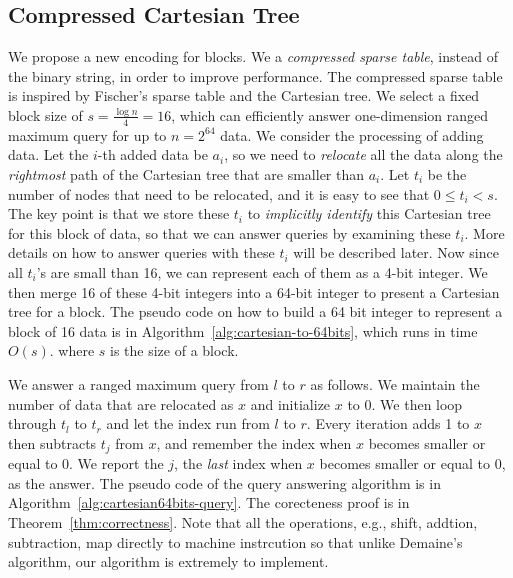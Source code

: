 
\subsection{Compressed Cartesian Tree} \label{sec:cct}

We propose a new encoding for blocks.  We a {\em compressed sparse
  table}, instead of the binary string, in order to improve
performance.  The compressed sparse table is inspired by Fischer's
sparse table and the Cartesian tree.  We select a fixed block size of
$s = {{\frac{\log n}{4}}} = 16$, which can efficiently answer
one-dimension ranged maximum query for up to $n = 2^{64}$ data.  We
consider the processing of adding data.  Let the $i$-th added data be
$a_i$, so we need to {\em relocate} all the data along the {\em
  rightmost} path of the Cartesian tree that are smaller than $a_i$.
Let $t_i$ be the number of nodes that need to be relocated, and it
is easy to see that $0 \le t_i < s$.  The key point is that we store
these $t_i$ to {\em implicitly identify} this Cartesian tree for this
block of data, so that we can answer queries by examining these $t_i$.
More details on how to answer queries with these $t_i$ will be
described later.  Now since all $t_i$'s are small than 16, we can
represent each of them as a 4-bit integer.  We then merge 16 of these
4-bit integers into a 64-bit integer to present a Cartesian tree for a
block.  The pseudo code on how to build a 64 bit integer to represent
a block of 16 data is in Algorithm~\ref{alg:cartesian-to-64bits},
which runs in time $O(s)$. where $s$ is the size of a block.



We answer a ranged maximum query from $l$ to $r$ as follows.  We
maintain the number of data that are relocated as $x$ and initialize
$x$ to 0.  We then loop through $t_l$ to $t_r$ and let the index run
from $l$ to $r$.  Every iteration adds 1 to $x$ then subtracts $t_j$
from $x$, and remember the index when $x$ becomes smaller or equal to
0.  We report the $j$, the {\em last} index when $x$ becomes smaller
or equal to 0, as the answer.  The pseudo code of the query answering
algorithm is in Algorithm~\ref{alg:cartesian64bits-query}.  The
corecteness proof is in Theorem~\ref{thm:correctness}.  Note that all
the operations, e.g., shift, addtion, subtraction, map directly to
machine instrcution so that unlike Demaine's algorithm, our algorithm
is extremely to implement.

